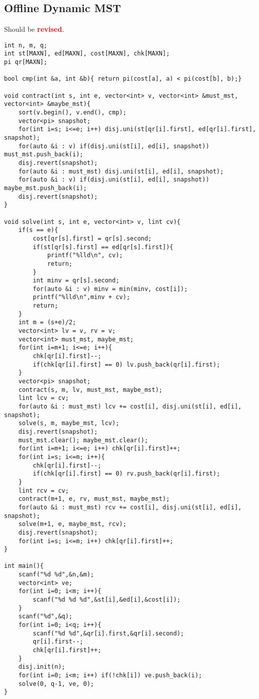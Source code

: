 \documentclass[landscape, 8pt, a4paper, oneside,  twocolumn]{extarticle}
\newcommand{\revised}{Should be \textcolor{red}{\textbf{revised}}.}
\begin{document}
\subsection{Offline Dynamic MST}
\revised
\begin{verbatim}
int n, m, q;
int st[MAXN], ed[MAXN], cost[MAXN], chk[MAXN];
pi qr[MAXN];

bool cmp(int &a, int &b){ return pi(cost[a], a) < pi(cost[b], b);}

void contract(int s, int e, vector<int> v, vector<int> &must_mst, vector<int> &maybe_mst){
	sort(v.begin(), v.end(), cmp);
	vector<pi> snapshot;
	for(int i=s; i<=e; i++) disj.uni(st[qr[i].first], ed[qr[i].first], snapshot);
	for(auto &i : v) if(disj.uni(st[i], ed[i], snapshot)) must_mst.push_back(i);
	disj.revert(snapshot);
	for(auto &i : must_mst) disj.uni(st[i], ed[i], snapshot);
	for(auto &i : v) if(disj.uni(st[i], ed[i], snapshot)) maybe_mst.push_back(i);
	disj.revert(snapshot);
}

void solve(int s, int e, vector<int> v, lint cv){
	if(s == e){
		cost[qr[s].first] = qr[s].second;
		if(st[qr[s].first] == ed[qr[s].first]){
			printf("%lld\n", cv);
			return;
		}
		int minv = qr[s].second;
		for(auto &i : v) minv = min(minv, cost[i]);
		printf("%lld\n",minv + cv);
		return;
	}
	int m = (s+e)/2;
	vector<int> lv = v, rv = v;
	vector<int> must_mst, maybe_mst;
	for(int i=m+1; i<=e; i++){
		chk[qr[i].first]--;
		if(chk[qr[i].first] == 0) lv.push_back(qr[i].first);
	}
	vector<pi> snapshot;
	contract(s, m, lv, must_mst, maybe_mst);
	lint lcv = cv;
	for(auto &i : must_mst) lcv += cost[i], disj.uni(st[i], ed[i], snapshot);
	solve(s, m, maybe_mst, lcv);
	disj.revert(snapshot);
	must_mst.clear(); maybe_mst.clear();
	for(int i=m+1; i<=e; i++) chk[qr[i].first]++;
	for(int i=s; i<=m; i++){
		chk[qr[i].first]--;
		if(chk[qr[i].first] == 0) rv.push_back(qr[i].first);
	}
	lint rcv = cv;
	contract(m+1, e, rv, must_mst, maybe_mst);
	for(auto &i : must_mst) rcv += cost[i], disj.uni(st[i], ed[i], snapshot);
	solve(m+1, e, maybe_mst, rcv);
	disj.revert(snapshot);
	for(int i=s; i<=m; i++) chk[qr[i].first]++;
}

int main(){
	scanf("%d %d",&n,&m);
	vector<int> ve;
	for(int i=0; i<m; i++){
		scanf("%d %d %d",&st[i],&ed[i],&cost[i]);
	}
	scanf("%d",&q);
	for(int i=0; i<q; i++){
		scanf("%d %d",&qr[i].first,&qr[i].second);
		qr[i].first--;
		chk[qr[i].first]++;
	}
	disj.init(n);
	for(int i=0; i<m; i++) if(!chk[i]) ve.push_back(i);
	solve(0, q-1, ve, 0);
}
\end{verbatim}
\end{document}
